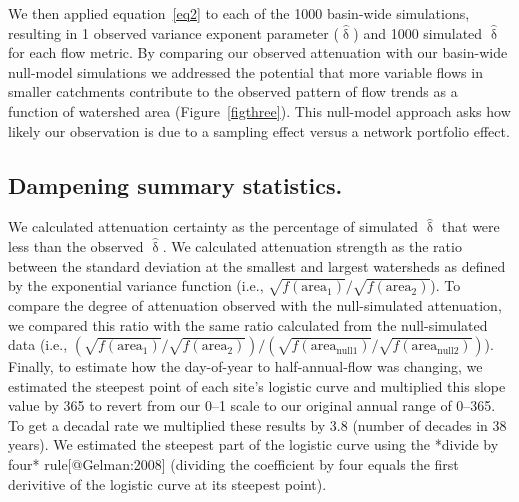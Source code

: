 \documentclass[9pt,twocolumn,twoside,lineno]{pnas-new}
\begin{document}
{We then applied equation~\ref{eq2} to each of the 1000 basin-wide simulations, resulting in 1 observed variance exponent parameter ($\hat{\updelta}$) and 1000 simulated $\hat{\updelta}$ for each flow metric. By comparing our observed attenuation with our basin-wide null-model simulations we addressed the potential that more variable flows in smaller catchments contribute to the observed pattern of flow trends as a function of watershed area (Figure~\ref{figthree}). This null-model approach asks how likely our observation is due to a sampling effect versus a network portfolio effect.

\subsection{Dampening summary statistics.} We calculated attenuation certainty as the percentage of simulated $\hat{\updelta}$ that were less than the observed $\hat{\updelta}$. We calculated attenuation strength as the ratio between the standard deviation at the smallest and largest watersheds as defined by the exponential variance function (i.e., $\sqrt{f(\mathrm{area}_1)} / \sqrt{f(\mathrm{area}_2)}$). To compare the degree of attenuation observed with the null-simulated attenuation, we compared this ratio with the same ratio calculated from the null-simulated data (i.e., $\left( \sqrt{f(\mathrm{area}_1)} / \sqrt{f(\mathrm{area}_2)} \right) / \left( \sqrt{f(\mathrm{area}_{\mathrm{null} 1})} / \sqrt{f(\mathrm{area}_{\mathrm{null} 2})} \right)$). Finally, to estimate how the day-of-year to half-annual-flow was changing, we estimated the steepest point of each site's logistic curve and multiplied this slope value by 365 to revert from our 0--1 scale to our original annual range of 0--365. To get a decadal rate we multiplied these results by 3.8 (number of decades in 38 years). We estimated the steepest part of the logistic curve using the *divide by four* rule[@Gelman:2008] (dividing the coefficient by four equals the first derivitive of the logistic curve at its steepest point).

}
\end{document}
